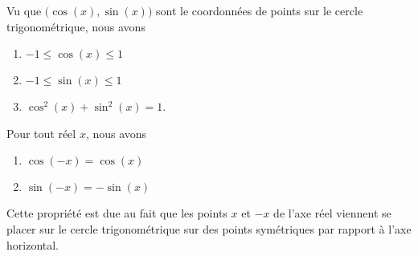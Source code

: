 \begin{center}
   
\end{center}

\begin{propriete}
    Vu que \( \big( \cos(x),\sin(x) \big)\) sont le coordonnées de points sur le cercle trigonométrique, nous avons
    \begin{enumerate}
        \item
            \( -1\leq \cos(x)\leq 1\)
        \item
            \( -1\leq \sin(x)\leq 1\)
        \item
            \( \cos^2(x)+\sin^2(x)=1\).
    \end{enumerate}
\end{propriete}

\begin{propriete}
    Pour tout réel \( x\), nous avons
    \begin{enumerate}
        \item
            \( \cos(-x)=\cos(x)\)
        \item
        \( \sin(-x)=-\sin(x)\)
    \end{enumerate}
\end{propriete}
Cette propriété est due au fait que les points \( x\) et \( -x\) de l'axe réel viennent se placer sur le cercle trigonométrique sur des points symétriques par rapport à l'axe horizontal.
